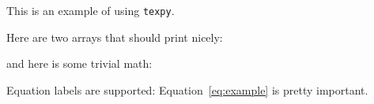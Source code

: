 This is an example of using \texttt{texpy}.


Here are two arrays that should print nicely:

and here is some trivial math:

Equation labels are supported:
Equation~\ref{eq:example} is pretty important.
